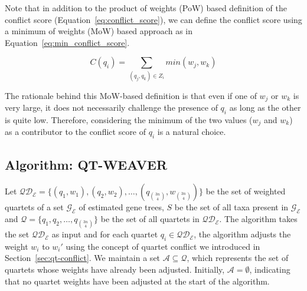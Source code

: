 \documentclass[runningheads]{llncs}
\begin{document}
%


Note that in addition to the product of weights (PoW) based definition of the conflict score (Equation~\ref{eq:conflict_score}), we can define the conflict score using a minimum of weights (MoW) based approach as in Equation~\ref{eq:min_conflict_score}. %

\begin{equation}
\label{eq:min_conflict_score}
C(q_i) = \sum_{(q_j, q_k) \in Z_i} min(w_j , w_k)
\end{equation}

The rationale behind this MoW-based definition is that even if one of $w_j$ or $w_k$ is very large, it does not necessarily challenge the presence of $q_i$ as long as the other is quite low. Therefore, considering the minimum of the two values ($w_j$ and $w_k$) as a contributor to the conflict score of $q_i$ is a natural choice.


\subsection{Algorithm: QT-WEAVER}
\label{sec:qt-weaver-algorithm}

Let $\mathcal{QD_E} = \{ (q_1,w_1), (q_2,w_2), \ldots, (q_{3n \choose 4},w_{3n \choose 4}) \}$ be the set of weighted quartets of a set $\mathcal{G_E}$ of estimated gene trees, $S$ be the set of all taxa present in  $\mathcal{G_E}$ and $\mathcal{Q} = \{ q_1, q_2, \ldots,q_{3n \choose 4} \} $ be the set of all quartets in $\mathcal{QD_E}$. The algorithm takes the set $\mathcal{QD_E}$ as input and for each quartet $q_i \in \mathcal{QD_E}$, the algorithm adjusts the weight $w_i$ to $w_i'$ using the concept of quartet conflict we introduced in Section~\ref{sec:qt-conflict}. We maintain a set \( \mathcal{A} \subseteq \mathcal{Q} \), which represents the set of quartets whose weights have already been adjusted.  Initially, \( \mathcal{A} = \emptyset \), indicating that no quartet weights have been adjusted at the start of the algorithm.
\end{document}
